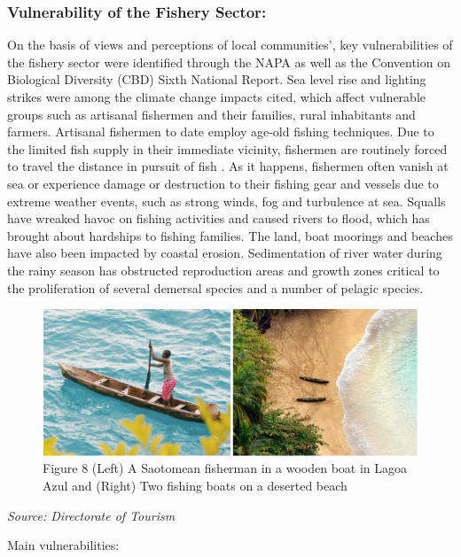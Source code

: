 \documentclass[
]{book}
\begin{document}
\hypertarget{vulnerability-of-the-fishery-sector-1}{%
\subsubsection{Vulnerability of the Fishery Sector:}\label{vulnerability-of-the-fishery-sector-1}}

On the basis of views and perceptions of local communities', key vulnerabilities of the fishery sector were identified through the NAPA as well as the Convention on Biological Diversity (CBD) Sixth National Report. Sea level rise and lighting strikes were among the climate change impacts cited, which affect vulnerable groups such as artisanal fishermen and their families, rural inhabitants and farmers. Artisanal fishermen to date employ age-old fishing techniques. Due to the limited fish supply in their immediate vicinity, fishermen are routinely forced to travel the distance in pursuit of fish . As it happens, fishermen often vanish at sea or experience damage or destruction to their fishing gear and vessels due to extreme weather events, such as strong winds, fog and turbulence at sea. Squalls have wreaked havoc on fishing activities and caused rivers to flood, which has brought about hardships to fishing families. The land, boat moorings and beaches have also been impacted by coastal erosion. Sedimentation of river water during the rainy season has obstructed reproduction areas and growth zones critical to the proliferation of several demersal species and a number of pelagic species.

\begin{figure}
\centering
\includegraphics{images/tourism.png}
\caption{Figure 8 (Left) A Saotomean fisherman in a wooden boat in Lagoa Azul and (Right) Two fishing boats on a deserted beach}
\end{figure}

\emph{Source: Directorate of Tourism }

Main vulnerabilities:
\end{document}
